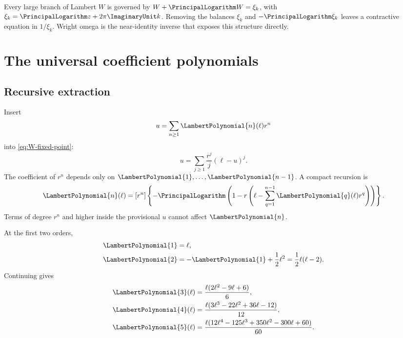 \documentclass[11pt,openany]{book}
\theoremstyle{definition}
\theoremstyle{plain}
\theoremstyle{remark}
\begin{document}
\begin{summarybox}
Every large branch of Lambert \(W\) is governed by \(W+\PrincipalLogarithm W=\xi_k\), with \(\xi_k=\PrincipalLogarithm z+2\pi\ImaginaryUnit k\). Removing the balances \(\xi_k\) and \(-\PrincipalLogarithm\xi_k\) leaves a contractive equation in \(1/\xi_k\). Wright omega is the near-identity inverse that exposes this structure directly.
\end{summarybox}

\chapter{The universal coefficient polynomials}\label{ch:W-coefficients}

\section{Recursive extraction}
Insert
\[
 u=\sum_{n\ge1}\LambertPolynomial{n}(\ell)r^n
\]
into \cref{eq:W-fixed-point}:
\begin{equation}\label{eq:W-recursive-master}
 u=\sum_{j\ge1}\frac{r^j}{j}(\ell-u)^j.
\end{equation}
The coefficient of \(r^n\) depends only on \(\LambertPolynomial{1},\ldots,\LambertPolynomial{n-1}\). A compact recursion is
\begin{equation}\label{eq:Pn-coefficient-recursion}
 \LambertPolynomial{n}(\ell)=
 [r^n]\left\{-\PrincipalLogarithm\left(1-r\left(\ell-
 \sum_{q=1}^{n-1}\LambertPolynomial{q}(\ell)r^q\right)\right)\right\}.
\end{equation}
Terms of degree \(r^n\) and higher inside the provisional \(u\) cannot affect \(\LambertPolynomial{n}\).

At the first two orders,
\begin{align*}
 \LambertPolynomial{1}&=\ell,\\
 \LambertPolynomial{2}&=-\LambertPolynomial{1}+\frac12\ell^2
 =\frac12\ell(\ell-2).
\end{align*}
Continuing gives
\begin{align}
 \LambertPolynomial{3}(\ell)&=\frac{\ell(2\ell^2-9\ell+6)}6,\label{eq:P3}\\
 \LambertPolynomial{4}(\ell)&=\frac{\ell(3\ell^3-22\ell^2+36\ell-12)}{12},\label{eq:P4}\\
 \LambertPolynomial{5}(\ell)&=\frac{\ell(12\ell^4-125\ell^3+350\ell^2-300\ell+60)}{60}.
\label{eq:P5}
\end{align}
\end{document}
